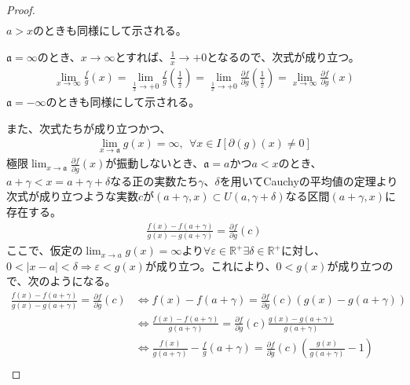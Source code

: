 \documentclass[dvipdfmx]{jsarticle}
\begin{document}
\begin{proof}
\begin{align*}
\end{align*}
$a > x$のときも同様にして示される。\par
$\mathfrak{a = \infty}$のとき、$x \rightarrow \infty$とすれば、$\frac{1}{x} \rightarrow + 0$となるので、次式が成り立つ。
\begin{align*}
\lim_{x \rightarrow \infty}{\frac{f}{g}(x)} = \lim_{\frac{1}{x} \rightarrow + 0}{\frac{f}{g}\left( \frac{1}{\frac{1}{x}} \right)} = \lim_{\frac{1}{x} \rightarrow + 0}{\frac{\partial f}{\partial g}\left( \frac{1}{\frac{1}{x}} \right)} = \lim_{x \rightarrow \infty}{\frac{\partial f}{\partial g}(x)}
\end{align*}
$\mathfrak{a = - \infty}$のときも同様にして示される。\par
また、次式たちが成り立つかつ、
\begin{align*}
\lim_{x \rightarrow \mathfrak{a}}{g(x)} = \infty,\ \ \forall x \in I\left[ \partial(g)(x) \neq 0 \right]
\end{align*}
極限$\lim_{x \rightarrow \mathfrak{a}}{\frac{\partial f}{\partial g}(x)}$が振動しないとき、$\mathfrak{a} =a$かつ$a < x$のとき、$a + \gamma < x = a + \gamma + \delta$なる正の実数たち$\gamma$、$\delta$を用いてCauchyの平均値の定理より次式が成り立つような実数$c$が$\left( a + \gamma,x \right) \subset U\left( a,\gamma + \delta \right)$なる区間$\left( a + \gamma,x \right)$に存在する。
\begin{align*}
\frac{f(x) - f\left( a + \gamma \right)}{g(x) - g\left( a + \gamma \right)} = \frac{\partial f}{\partial g}(c)
\end{align*}
ここで、仮定の$\lim_{x \rightarrow a}{g(x)} = \infty$より$\forall\varepsilon \in \mathbb{R}^{+}\exists\delta \in \mathbb{R}^{+}$に対し、$0 < |x - a| < \delta \Rightarrow \varepsilon < g(x)$が成り立つ。これにより、$0 < g(x)$が成り立つので、次のようになる。
\begin{align*}
\frac{f(x) - f\left( a + \gamma \right)}{g(x) - g\left( a + \gamma \right)} = \frac{\partial f}{\partial g}(c) &\Leftrightarrow f(x) - f\left( a + \gamma \right) = \frac{\partial f}{\partial g}(c)\left( g(x) - g\left( a + \gamma \right) \right)\\
&\Leftrightarrow \frac{f(x) - f\left( a + \gamma \right)}{g\left( a + \gamma \right)} = \frac{\partial f}{\partial g}(c)\frac{g(x) - g\left( a + \gamma \right)}{g\left( a + \gamma \right)}\\
&\Leftrightarrow \frac{f(x)}{g\left( a + \gamma \right)} - \frac{f}{g}\left( a + \gamma \right) = \frac{\partial f}{\partial g}(c)\left( \frac{g(x)}{g\left( a + \gamma \right)} - 1 \right)\\

\end{align*}
\end{proof}
\end{document}
